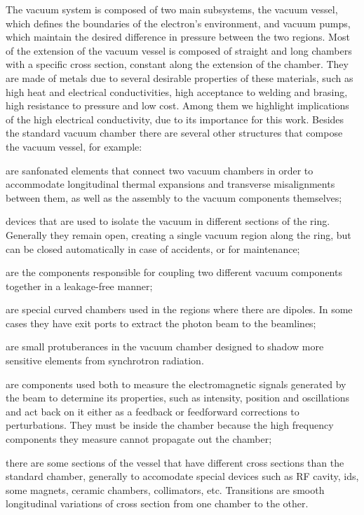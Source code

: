     The vacuum system is composed of two main subsystems, the vacuum vessel, which defines the boundaries of the electron's environment, and vacuum pumps, which maintain the desired difference in pressure between the two regions. Most of the extension of the vacuum vessel is composed of straight and long chambers with a specific cross section, constant along the extension of the chamber. They are made of metals due to several desirable properties of these materials, such as high heat and electrical conductivities, high acceptance to welding and brasing, high resistance to pressure and low cost. Among them we highlight implications of the high electrical conductivity, due to its importance for this work. Besides the standard vacuum chamber there are several other structures that compose the vacuum vessel, for example:
    \begin{description}[align=left]
        \item[Bellows:] are sanfonated elements that connect two vacuum chambers in order to accommodate longitudinal thermal expansions and transverse misalignments between them, as well as the assembly to the vacuum components themselves;
        \item[Valves:] devices that are used to isolate the vacuum in different sections of the ring. Generally they remain open, creating a single vacuum region along the ring, but can be closed automatically in case of accidents, or for maintenance;
        \item[Flanges:] are the components responsible for coupling two different vacuum components together in a leakage-free manner;
        \item[Dipole Chambers:] are special curved chambers used in the regions where there are dipoles. In some cases they have exit ports to extract the photon beam to the beamlines;
        \item[Radiation Masks:] are small protuberances in the vacuum chamber designed to shadow more sensitive elements from synchrotron radiation.
        \item[Diagnostic Elements:] are components used both to measure the electromagnetic signals generated by the beam to determine its properties, such as intensity, position and oscillations and act back on it either as a feedback or feedforward corrections to perturbations. They must be inside the chamber because the high frequency components they measure cannot propagate out the chamber;
        \item[Transitions:] there are some sections of the vessel that have different cross sections than the standard chamber, generally to accomodate special devices such as RF cavity, \glspl{id}, some magnets, ceramic chambers, collimators, etc. Transitions are smooth longitudinal variations of cross section from one chamber to the other.
    \end{description}

